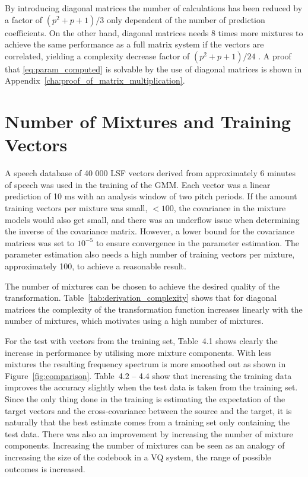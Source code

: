 By introducing diagonal matrices the number of calculations has been reduced by a factor of $(p^2+p+1)/3$ only dependent of the number of prediction coefficients. On the other hand, diagonal matrices needs 8 times more mixtures to achieve the same performance as a full matrix system if the vectors are correlated, yielding a complexity decrease factor of $(p^2+p+1)/24$ \cite{stylianou98}. A proof that \eqref{eq:param_computed} is solvable by the use of diagonal matrices is shown in Appendix~\ref{cha:proof_of_matrix_multiplication}. 


\section{Number of Mixtures and Training Vectors} %
\label{sec:number_of_mixture}
A speech database of 40 000 LSF vectors derived from approximately 6 minutes of speech was used in the training of the GMM. Each vector was a linear prediction of 10 ms with an analysis window of two pitch periods. If the amount training vectors per mixture was small, \eg $<100$, the covariance in the mixture models would also get small, and there was an underflow issue when determining the inverse of the covariance matrix. However, a lower bound for the covariance matrices was set to $10^{-5}$ to ensure convergence in the parameter estimation. The parameter estimation also needs a high number of training vectors per mixture, approximately 100, to achieve a reasonable result.

The number of mixtures can be chosen to achieve the desired quality of the transformation. Table~\ref{tab:derivation_complexity} shows that for diagonal matrices the complexity of the transformation function increases linearly with the number of mixtures, which motivates using a high number of mixtures.

For the test with vectors from the training set, Table~4.1 shows clearly the increase in performance by utilising more mixture components. With less mixtures the resulting frequency spectrum is more smoothed out as shown in Figure~\ref{fig:comparison}. Table~4.2 -- 4.4 show that increasing the training data improves the accuracy slightly when the test data is taken from the training set. Since the only thing done in the training is estimating the expectation of the target vectors and the cross-covariance between the source and the target, it is naturally that the best estimate comes from a training set only containing the test data. There was also an improvement by increasing the number of mixture components. Increasing the number of mixtures can be seen as an analogy of increasing the size of the codebook in a VQ system, the range of possible outcomes is increased. 


